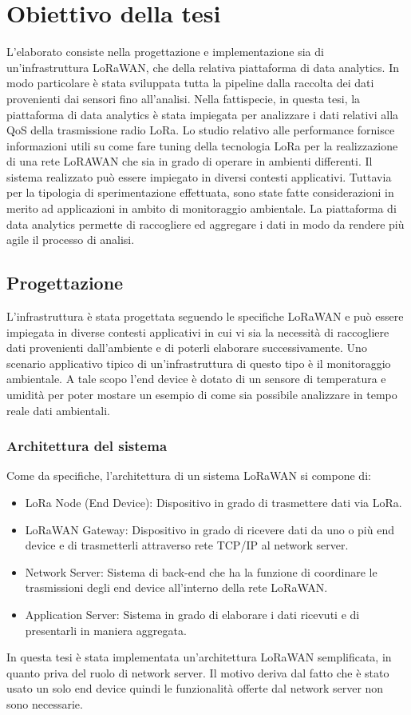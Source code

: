 \documentclass[12pt,a4paper,openright,twoside]{report}
\begin{document}
\part{Obiettivo della tesi}
L'elaborato consiste nella progettazione e implementazione sia di un'infrastruttura LoRaWAN, che della relativa piattaforma di data analytics. In modo particolare \`e stata sviluppata tutta la pipeline dalla raccolta dei dati provenienti dai sensori fino all'analisi. 
Nella fattispecie, in questa tesi, la piattaforma di data analytics \`e stata impiegata per analizzare i dati relativi alla QoS della trasmissione radio LoRa.
Lo studio relativo alle performance fornisce informazioni utili su come fare tuning della tecnologia LoRa per la realizzazione di una rete LoRAWAN che sia in grado di operare in ambienti differenti.
Il sistema realizzato pu\`o essere impiegato in diversi contesti applicativi. Tuttavia per la tipologia di sperimentazione effettuata, sono state fatte considerazioni in merito ad applicazioni in ambito di monitoraggio ambientale.
La piattaforma di data analytics permette di raccogliere ed aggregare i dati in modo da rendere pi\`u agile il processo di analisi. 

\chapter{Progettazione}
L'infrastruttura \`e stata progettata seguendo le specifiche LoRaWAN e pu\`o essere impiegata in diverse contesti applicativi in cui vi sia la necessit\`a di raccogliere dati provenienti dall'ambiente e di poterli elaborare successivamente. Uno scenario applicativo tipico di un'infrastruttura di questo tipo \`e il monitoraggio ambientale. A tale scopo l'end device \`e dotato di un sensore di temperatura e umidit\`a per poter mostare un esempio di come sia possibile analizzare in tempo reale dati ambientali.   

\section{Architettura del sistema}
Come da specifiche, l'architettura di un sistema LoRaWAN si compone di: 
\begin{itemize}                       
\item LoRa Node (End Device): Dispositivo in grado di trasmettere dati via LoRa.
\item LoRaWAN Gateway: Dispositivo in grado di ricevere dati da uno o pi\`u end device e di trasmetterli attraverso rete TCP/IP al network server.
\item Network Server: Sistema di back-end che ha la funzione di coordinare le trasmissioni degli end device all'interno della rete LoRaWAN.
\item Application Server: Sistema in grado di elaborare i dati ricevuti e di presentarli in maniera aggregata.
\end{itemize}
In questa tesi \`e stata implementata un'architettura LoRaWAN semplificata, in quanto priva del ruolo di network server. Il motivo deriva dal fatto che \`e stato usato un solo end device quindi le funzionalit\`a offerte dal network server non sono necessarie.  
\end{document}
